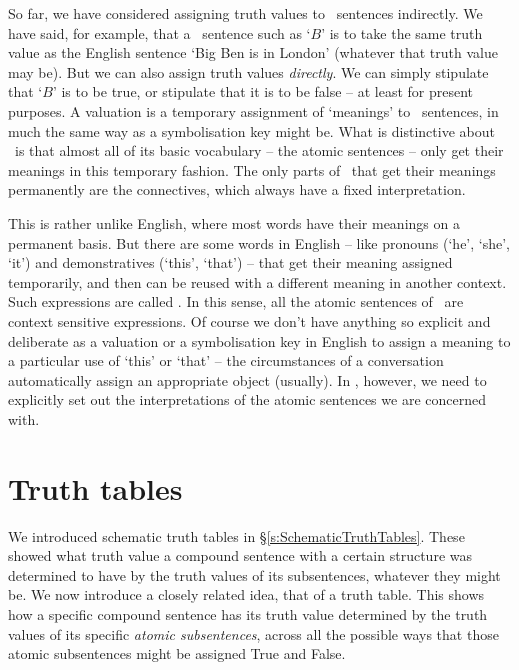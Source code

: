 So far, we have considered assigning truth values to \TFL\ sentences indirectly. We have said, for example, that a \TFL\ sentence such as `$B$' is to take the same truth value as the English sentence `Big Ben is in London' (whatever that truth value may be). But we can also assign truth values \emph{directly}. We can simply stipulate that `$B$' is to be true, or stipulate that it is to be false – at least for present purposes. 
A valuation is a temporary assignment of `meanings' to \TFL\ sentences, in much the same way as a symbolisation key might be. What is distinctive about \TFL\ is that almost all of its basic vocabulary – the atomic sentences – only get their meanings in this temporary fashion. The only parts of \TFL\ that get their meanings permanently are the connectives, which always have a fixed interpretation. 

This is rather unlike English, where most words have their meanings on a permanent basis. But there are some words in English – like pronouns (`he', `she', `it') and demonstratives (`this', `that') – that get their meaning assigned temporarily, and then can be reused with a different meaning in another context. Such expressions are called . In this sense, all the atomic sentences of \TFL\ are context sensitive expressions. Of course we don't have anything so explicit and deliberate as a valuation or a symbolisation key in English to assign a meaning to a particular use of `this' or `that' – the circumstances of a conversation automatically assign an appropriate object (usually). In \TFL, however, we need to explicitly set out the interpretations of the atomic sentences we are concerned with. 

\section{Truth tables}

We introduced schematic truth tables in §\ref{s:SchematicTruthTables}. These showed what truth value a compound sentence with a certain structure was determined to have by the truth values of its subsentences, whatever they might be. We now introduce a closely related idea, that of a truth table. This shows how a specific compound sentence has its truth value determined by the truth values of its specific \emph{atomic subsentences}, across all the possible ways that those atomic subsentences might be assigned True and False.

